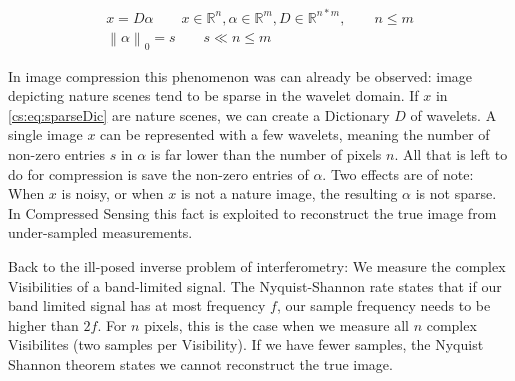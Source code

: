 \begin{equation} \label{cs:eq:sparseDic}
	\begin{split}
		x = D \alpha  \qquad  x \in \mathbb{R}^{n}, \alpha \in \mathbb{R}^{m}, D \in \mathbb{R}^{n*m}, \qquad n \leq m \\
		\left \| \alpha \right \|_0 = s \qquad s \ll n \leq m
	\end{split}
\end{equation}

In image compression this phenomenon was can already be observed: image depicting nature scenes tend to be sparse in the wavelet domain. If $x$ in \eqref{cs:eq:sparseDic} are nature scenes, we can create a Dictionary $D$ of wavelets. A single image $x$ can be represented with a few wavelets, meaning the number of non-zero entries $s$ in $\alpha$ is far lower than the number of pixels $n$. All that is left to do for compression is save the non-zero entries of $\alpha$. Two effects are of note: When $x$ is noisy, or when $x$ is not a nature image, the resulting $\alpha$ is not sparse. In Compressed Sensing this fact is exploited to reconstruct the true image from under-sampled measurements.


Back to the ill-posed inverse problem of interferometry: We measure the complex Visibilities of a band-limited signal. The Nyquist-Shannon rate states that if our band limited signal has at most frequency $f$, our sample frequency needs to be higher than $2f$. For $n$ pixels, this is the case when we measure all $n$ complex Visibilites (two samples per Visibility). If we have fewer samples, the Nyquist Shannon theorem states we cannot reconstruct the true image.

